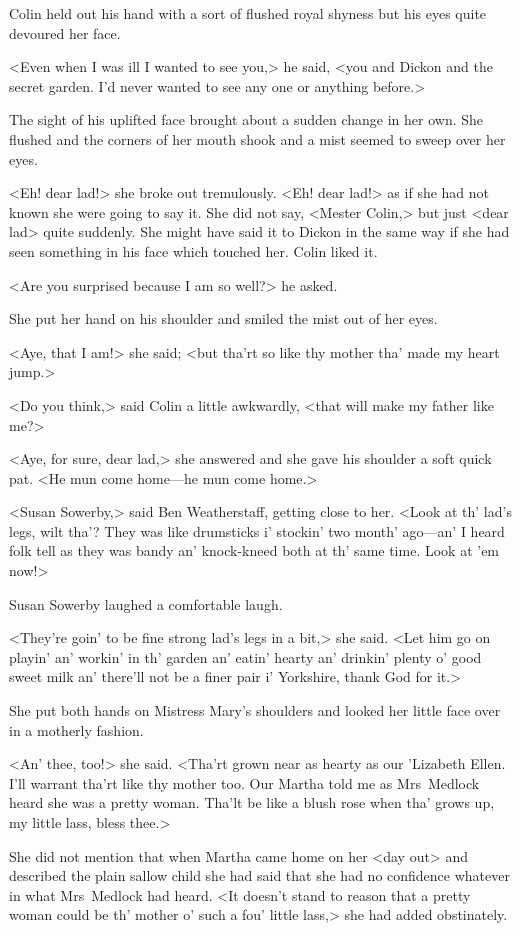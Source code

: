 Colin held out his hand with a sort of flushed royal shyness but his eyes quite devoured her face.

<Even when I was ill I wanted to see you,> he said, <you and Dickon and the secret garden. I'd never wanted to see any one or anything before.>

The sight of his uplifted face brought about a sudden change in her own. She flushed and the corners of her mouth shook and a mist seemed to sweep over her eyes.

<Eh! dear lad!> she broke out tremulously. <Eh! dear lad!> as if she had not known she were going to say it. She did not say, <Mester Colin,> but just <dear lad> quite suddenly. She might have said it to Dickon in the same way if she had seen something in his face which touched her. Colin liked it.

<Are you surprised because I am so well?> he asked.

She put her hand on his shoulder and smiled the mist out of her eyes.

<Aye, that I am!> she said; <but tha'rt so like thy mother tha' made my heart jump.>

<Do you think,> said Colin a little awkwardly, <that will make my father like me?>

<Aye, for sure, dear lad,> she answered and she gave his shoulder a soft quick pat. <He mun come home—he mun come home.>

<Susan Sowerby,> said Ben Weatherstaff, getting close to her. <Look at th' lad's legs, wilt tha'? They was like drumsticks i' stockin' two month' ago—an' I heard folk tell as they was bandy an' knock-kneed both at th' same time. Look at 'em now!>

Susan Sowerby laughed a comfortable laugh.

<They're goin' to be fine strong lad's legs in a bit,> she said. <Let him go on playin' an' workin' in th' garden an' eatin' hearty an' drinkin' plenty o' good sweet milk an' there'll not be a finer pair i' Yorkshire, thank God for it.>

She put both hands on Mistress Mary's shoulders and looked her little face over in a motherly fashion.

<An' thee, too!> she said. <Tha'rt grown near as hearty as our 'Lizabeth Ellen. I'll warrant tha'rt like thy mother too. Our Martha told me as Mrs~Medlock heard she was a pretty woman. Tha'lt be like a blush rose when tha' grows up, my little lass, bless thee.>

She did not mention that when Martha came home on her <day out> and described the plain sallow child she had said that she had no confidence whatever in what Mrs~Medlock had heard. <It doesn't stand to reason that a pretty woman could be th' mother o' such a fou' little lass,> she had added obstinately.

